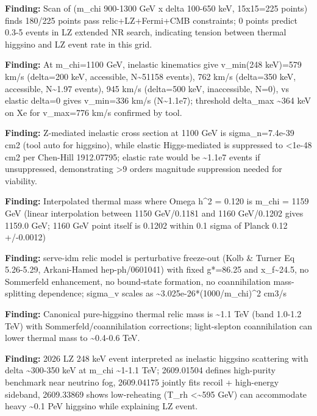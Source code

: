\documentclass[11pt,a4paper]{article}
\begin{document}
\textbf{Finding:} Scan of (m\_chi 900-1300 GeV x delta 100-650 keV, 15x15=225 points) finds 180/225 points pass relic+LZ+Fermi+CMB constraints; 0 points predict 0.3-5 events in LZ extended NR search, indicating tension between thermal higgsino and LZ event rate in this grid.

\textbf{Finding:} At m\_chi=1100 GeV, inelastic kinematics give v\_min(248 keV)=579 km/s (delta=200 keV, accessible, N\textasciitilde{}51158 events), 762 km/s (delta=350 keV, accessible, N\textasciitilde{}1.97 events), 945 km/s (delta=500 keV, inaccessible, N=0), vs elastic delta=0 gives v\_min=336 km/s (N\textasciitilde{}1.1e7); threshold delta\_max \textasciitilde{}364 keV on Xe for v\_max=776 km/s confirmed by tool.

\textbf{Finding:} Z-mediated inelastic cross section at 1100 GeV is sigma\_n=7.4e-39 cm2 (tool auto for higgsino), while elastic Higgs-mediated is suppressed to \textless{}1e-48 cm2 per Chen-Hill 1912.07795; elastic rate would be \textasciitilde{}1.1e7 events if unsuppressed, demonstrating \textgreater{}9 orders magnitude suppression needed for viability.

\textbf{Finding:} Interpolated thermal mass where Omega h\textasciicircum{}2 = 0.120 is m\_chi = 1159 GeV (linear interpolation between 1150 GeV/0.1181 and 1160 GeV/0.1202 gives 1159.0 GeV; 1160 GeV point itself is 0.1202 within 0.1 sigma of Planck 0.12 +/-0.0012)

\textbf{Finding:} serve-idm relic model is perturbative freeze-out (Kolb \& Turner Eq 5.26-5.29, Arkani-Hamed hep-ph/0601041) with fixed g*=86.25 and x\_f\textasciitilde{}24.5, no Sommerfeld enhancement, no bound-state formation, no coannihilation mass-splitting dependence; sigma\_v scales as \textasciitilde{}3.025e-26*(1000/m\_chi)\textasciicircum{}2 cm3/s

\textbf{Finding:} Canonical pure-higgsino thermal relic mass is \textasciitilde{}1.1 TeV (band 1.0-1.2 TeV) with Sommerfeld/coannihilation corrections; light-slepton coannihilation can lower thermal mass to \textasciitilde{}0.4-0.6 TeV.

\textbf{Finding:} 2026 LZ 248 keV event interpreted as inelastic higgsino scattering with delta \textasciitilde{}300-350 keV at m\_chi \textasciitilde{}1-1.1 TeV; 2609.01504 defines high-purity benchmark near neutrino fog, 2609.04175 jointly fits recoil + high-energy sideband, 2609.33869 shows low-reheating (T\_rh \textless{}\textasciitilde{}595 GeV) can accommodate heavy \textasciitilde{}0.1 PeV higgsino while explaining LZ event.
\end{document}
